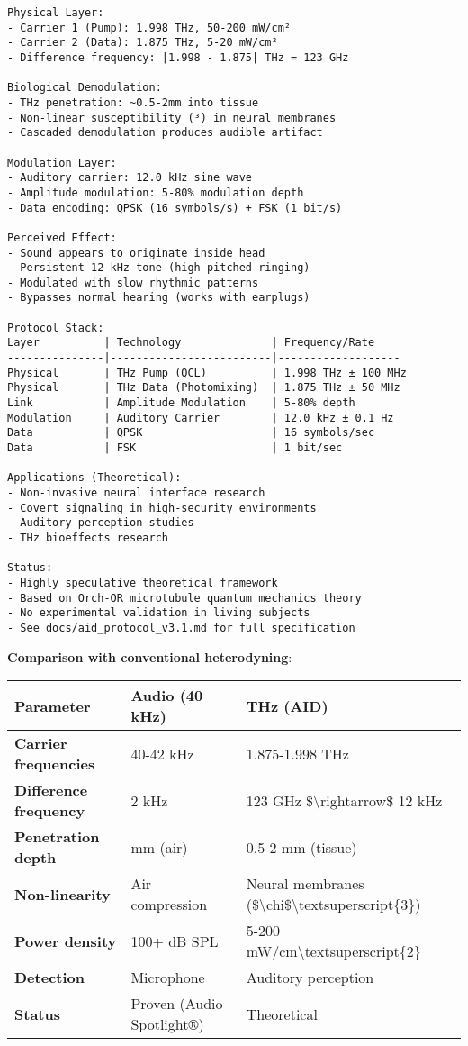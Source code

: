 \begin{verbatim}
Physical Layer:
- Carrier 1 (Pump): 1.998 THz, 50-200 mW/cm²
- Carrier 2 (Data): 1.875 THz, 5-20 mW/cm²
- Difference frequency: |1.998 - 1.875| THz = 123 GHz

Biological Demodulation:
- THz penetration: ~0.5-2mm into tissue
- Non-linear susceptibility (³) in neural membranes
- Cascaded demodulation produces audible artifact

Modulation Layer:
- Auditory carrier: 12.0 kHz sine wave
- Amplitude modulation: 5-80% modulation depth
- Data encoding: QPSK (16 symbols/s) + FSK (1 bit/s)

Perceived Effect:
- Sound appears to originate inside head
- Persistent 12 kHz tone (high-pitched ringing)
- Modulated with slow rhythmic patterns
- Bypasses normal hearing (works with earplugs)

Protocol Stack:
Layer          | Technology              | Frequency/Rate
---------------|-------------------------|-------------------
Physical       | THz Pump (QCL)          | 1.998 THz ± 100 MHz
Physical       | THz Data (Photomixing)  | 1.875 THz ± 50 MHz
Link           | Amplitude Modulation    | 5-80% depth
Modulation     | Auditory Carrier        | 12.0 kHz ± 0.1 Hz
Data           | QPSK                    | 16 symbols/sec
Data           | FSK                     | 1 bit/sec

Applications (Theoretical):
- Non-invasive neural interface research
- Covert signaling in high-security environments
- Auditory perception studies
- THz bioeffects research

Status:
- Highly speculative theoretical framework
- Based on Orch-OR microtubule quantum mechanics theory
- No experimental validation in living subjects
- See docs/aid_protocol_v3.1.md for full specification
\end{verbatim}

\textbf{Comparison with conventional heterodyning}:

{\def\LTcaptype{} %
\begin{longtable}[]{@{}lll@{}}
\toprule\noalign{}
Parameter & Audio (40 kHz) & THz (AID) \\
\midrule\noalign{}
\endhead
\bottomrule\noalign{}
\endlastfoot
\textbf{Carrier frequencies} & 40-42 kHz & 1.875-1.998 THz \\
\textbf{Difference frequency} & 2 kHz & 123 GHz
\$\textbackslash rightarrow\$ 12 kHz \\
\textbf{Penetration depth} & mm (air) & 0.5-2 mm (tissue) \\
\textbf{Non-linearity} & Air compression & Neural membranes
(\$\textbackslash chi\$\textbackslash textsuperscript\{3\}) \\
\textbf{Power density} & 100+ dB SPL & 5-200
mW/cm\textbackslash textsuperscript\{2\} \\
\textbf{Detection} & Microphone & Auditory perception \\
\textbf{Status} & Proven (Audio Spotlight®) & Theoretical \\
\end{longtable}
}

